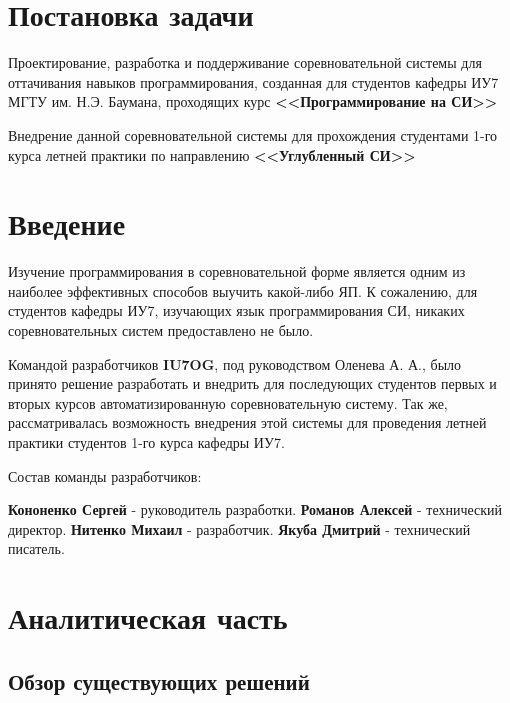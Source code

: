 \documentclass[a4paper,12pt]{article}
\begin{document}
\tableofcontents 
\clearpage

\section{Постановка задачи}

\noindent Проектирование, разработка и поддерживание соревновательной системы для оттачивания навыков программирования, созданная для студентов кафедры ИУ7 МГТУ им. Н.Э. Баумана, проходящих курс \textbf{<<Программирование на СИ>>}\newline

\noindent Внедрение данной соревновательной системы для прохождения студентами 1-го курса летней практики по направлению \textbf{<<Углубленный СИ>>}

\section{Введение}

\noindent Изучение программирования в соревновательной форме является одним из наиболее эффективных способов выучить какой-либо ЯП. К сожалению, для студентов кафедры ИУ7, изучающих язык программирования СИ, никаких соревновательных систем предоставлено не было. \newline

\noindent Командой разработчиков \textbf{IU7OG}, под руководством Оленева А. А., было принято решение разработать и внедрить для последующих студентов первых и вторых курсов автоматизированную соревновательную систему. Так же, рассматривалась возможность внедрения этой системы для проведения летней практики студентов 1-го курса кафедры ИУ7. \newline

\noindent Состав команды разработчиков:\newline

\noindent \textbf{Кононенко Сергей} - руководитель разработки.\newline
\noindent \textbf{Романов Алексей} - технический директор.\newline
\noindent \textbf{Нитенко Михаил} - разработчик.\newline
\noindent \textbf{Якуба Дмитрий} - технический писатель.

\section{Аналитическая часть}

\subsection{Обзор существующих решений}
\end{document}
